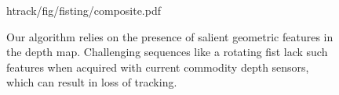 \begin{figure}[b]
\centering
\begin{overpic} 
[width=\linewidth]
{htrack/fig/fisting/composite.pdf}
\putfilename
\end{overpic}
\caption{
% 
Our algorithm relies on the presence of salient geometric features in the depth map. Challenging sequences like a rotating fist lack such features when acquired with current commodity depth sensors, which can result in loss of tracking. 
% 
}
\label{fig:fisting}
\end{figure}
